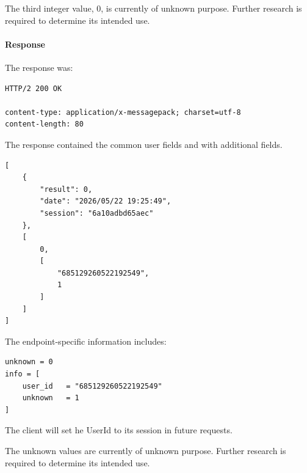 \begin{tcolorbox}[colback=yellow!10,colframe=orange!80!black,title=Warning]
The third integer value, $0$, is currently of unknown purpose.
Further research is required to determine its intended use.
\end{tcolorbox}

\newpage

\paragraph{Response}

The response was:

\begin{lstlisting}
HTTP/2 200 OK

content-type: application/x-messagepack; charset=utf-8
content-length: 80
\end{lstlisting}

The response contained the common user fields and with additional fields.

\begin{lstlisting}
[
    {
        "result": 0,
        "date": "2026/05/22 19:25:49",
        "session": "6a10adbd65aec"
    },
    [
        0,
        [
            "685129260522192549",
            1
        ]
    ]
]
\end{lstlisting}

The endpoint-specific information includes:

\begin{lstlisting}
unknown = 0
info = [
    user_id   = "685129260522192549"
    unknown   = 1
]
\end{lstlisting}

The client will set he UserId to its session in future requests.

\begin{tcolorbox}[colback=yellow!10,colframe=orange!80!black,title=Warning]
The unknown values are currently of unknown purpose.
Further research is required to determine its intended use.
\end{tcolorbox}

\newpage